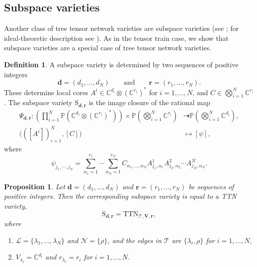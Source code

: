 \documentclass[12pt]{article}
\newtheorem{proposition}[theorem]{Proposition}
\theoremstyle{definition}
\newtheorem{definition}[theorem]{Definition}
\numberwithin{theorem}{section}
\newcommand{\PP}{\mathbb{P}}
\newcommand{\CC}{\mathbb{C}}
\begin{document}
\subsection{Subspace varieties}
\label{sec:subspace varieties}
Another class of tree tensor network varieties are subspace varieties (see \cite{Landsberg2012}; for ideal-theoretic description see \cite{landsberg2007, oeding2016}). As in the tensor train case, we show that subspace varieties are a special case of tree tensor network varieties. 
\begin{definition} 
A subspace variety is determined by two sequences of positive
integers
\[
\mathbf d=(d_1,\ldots,d_N)
\qquad\text{and}\qquad
\mathbf r=(r_1,\ldots,r_N).
\]
These determine local cores $A^i \in \CC^{d_i} \otimes (\CC^{r_i})^*$ for $i=1, \ldots, N$, and $C \in \bigotimes_{i=1}^{N} \CC^{r_i}$. The subspace variety $\mathrm{S}_{\mathbf{d}, \mathbf{r}}$ is the image closure of the 
rational map
\begin{equation}\label{eq:subspace-param}
    \begin{aligned}
        \Psi_{\mathbf{d},\mathbf{r}}:
\left(\prod_{i=1}^N \PP\left(\CC^{d_i} \otimes (\CC^{r_i})^*\right)\right) \times \PP(\bigotimes_{i=1}^{N} \CC^{r_i} )  
& \dashrightarrow
\mathbb{P}\!\left(\bigotimes_{i=1}^N \mathbb{C}^{d_i}\right), \\
\big(([A^i])_{i=1}^N, [C]\big)
& \longmapsto
[\psi] ,
    \end{aligned}
\end{equation}
where 
\begin{equation} \label{eq:S-entries}
 \psi_{j_1, \cdots, j_N} = \sum_{\alpha_1=1}^{r_1}
\cdots
\sum_{\alpha_{N}=1}^{r_{N}} C_{\alpha_1, ..., \alpha_N} A^1_{j_1,\alpha_1} A^2_{j_2,\alpha_2} \cdots A^N_{j_N, \alpha_{N}}.
 \end{equation}

\end{definition}
\begin{proposition}\label{prop:S_is_TTN}
Let $\mathbf d=(d_1,\ldots,d_N)$ and $\mathbf{r} = (r_1, \ldots,r_N)$ be sequences of positive integers. Then the corresponding subspace variety is equal to a TTN variety,
$$ \mathrm{S}_{\mathbf{d}, \mathbf{r}} = \mathrm{TTN}_{\mathscr{T}, \mathbf{V},\mathbf{r}},$$
where 
\begin{enumerate}
\item $\mathscr{L} = \{\lambda_1,\ldots, \lambda_N\}$ and $\mathscr{N} = \{\rho\}$, and the edges in $\mathscr{T}$ are  $\{\lambda_i, \rho\}$ 
for $i=1, \ldots, N$,
\item $V_{\lambda_i} = \CC^{d_i}$ and $r_{\lambda_i} = r_i$ for $i=1,\ldots, N$. 
\end{enumerate}
\end{proposition}
\end{document}
